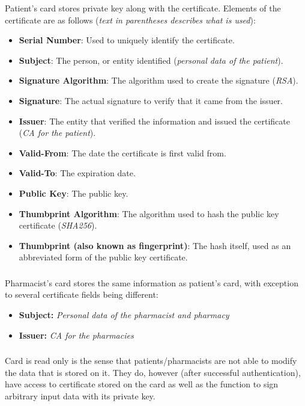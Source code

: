 Patient's card stores private key along with the certificate. Elements of the certificate are as follows ({\it text in parentheses describes what is used}):
\begin{itemize}
 \item {\bf Serial Number}: Used to uniquely identify the certificate.
 \item {\bf Subject}: The person, or entity identified ({\it personal data of the patient}).
 \item {\bf Signature Algorithm}: The algorithm used to create the signature ({\it RSA}).
 \item {\bf Signature}: The actual signature to verify that it came from the issuer.
 \item {\bf Issuer}: The entity that verified the information and issued the certificate ({\it CA for the patient}).
 \item {\bf Valid-From}: The date the certificate is first valid from.
 \item {\bf Valid-To}: The expiration date.
 \item {\bf Public Key}: The public key.
 \item {\bf Thumbprint Algorithm}: The algorithm used to hash the public key certificate ({\it SHA256}).
 \item {\bf Thumbprint (also known as fingerprint)}: The hash itself, used as an abbreviated form of the public key certificate.
\end{itemize}

\subsubsection{}

Pharmacist's card stores the same information as patient's card, with exception to several certificate fields being different:
\begin{itemize}
 \item {\bf Subject:} {\it Personal data of the pharmacist and pharmacy}
 \item {\bf Issuer:} {\it CA for the pharmacies}
\end{itemize}

\subsubsection{}

Card is read only is the sense that patients/pharmacists are not able to modify the data that is stored on it. They do, however (after successful authentication), have access to certificate stored on the card as well as the function to sign arbitrary input data with its private key.


